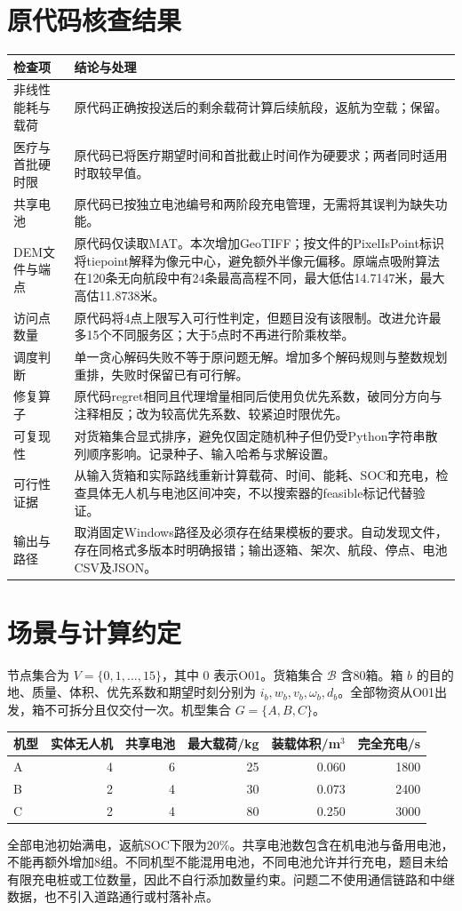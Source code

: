 \documentclass[a4paper,11pt]{article}
\begin{document}
\section{原代码核查结果}
\begin{longtable}{p{}p{}}
\toprule 检查项 & 结论与处理\\\midrule\endhead
非线性能耗与载荷 & 原代码正确按投送后的剩余载荷计算后续航段，返航为空载；保留。\\
医疗与首批硬时限 & 原代码已将医疗期望时间和首批截止时间作为硬要求；两者同时适用时取较早值。\\
共享电池 & 原代码已按独立电池编号和两阶段充电管理，无需将其误判为缺失功能。\\
DEM文件与端点 & 原代码仅读取MAT。本次增加GeoTIFF；按文件的PixelIsPoint标识将tiepoint解释为像元中心，避免额外半像元偏移。原端点吸附算法在120条无向航段中有24条最高高程不同，最大低估14.7147米，最大高估11.8738米。\\
访问点数量 & 原代码将4点上限写入可行性判定，但题目没有该限制。改进允许最多15个不同服务区；大于5点时不再进行阶乘枚举。\\
调度判断 & 单一贪心解码失败不等于原问题无解。增加多个解码规则与整数规划重排，失败时保留已有可行解。\\
修复算子 & 原代码regret相同且代理增量相同后使用负优先系数，破同分方向与注释相反；改为较高优先系数、较紧迫时限优先。\\
可复现性 & 对货箱集合显式排序，避免仅固定随机种子但仍受Python字符串散列顺序影响。记录种子、输入哈希与求解设置。\\
可行性证据 & 从输入货箱和实际路线重新计算载荷、时间、能耗、SOC和充电，检查具体无人机与电池区间冲突，不以搜索器的feasible标记代替验证。\\
输出与路径 & 取消固定Windows路径及必须存在结果模板的要求。自动发现文件，存在同格式多版本时明确报错；输出逐箱、架次、航段、停点、电池CSV及JSON。\\
\bottomrule
\end{longtable}

\section{场景与计算约定}
节点集合为 $V=\{0,1,\ldots,15\}$，其中 $0$ 表示O01。货箱集合 $\mathcal B$ 含80箱。箱 $b$ 的目的地、质量、体积、优先系数和期望时刻分别为 $i_b,w_b,v_b,\omega_b,d_b$。全部物资从O01出发，箱不可拆分且仅交付一次。机型集合 $G=\{A,B,C\}$。
\begin{center}
\begin{tabular}{lrrrrr}\toprule
机型 & 实体无人机 & 共享电池 & 最大载荷/kg & 装载体积/m$^3$ & 完全充电/s\\\midrule
A & 4 & 6 & 25 & 0.060 & 1800\\
B & 2 & 4 & 30 & 0.073 & 2400\\
C & 2 & 4 & 80 & 0.250 & 3000\\\bottomrule
\end{tabular}
\end{center}
全部电池初始满电，返航SOC下限为20\%。共享电池数包含在机电池与备用电池，不能再额外增加8组。不同机型不能混用电池，不同电池允许并行充电，题目未给有限充电桩或工位数量，因此不自行添加数量约束。问题二不使用通信链路和中继数据，也不引入道路通行或村落补点。
\end{document}
